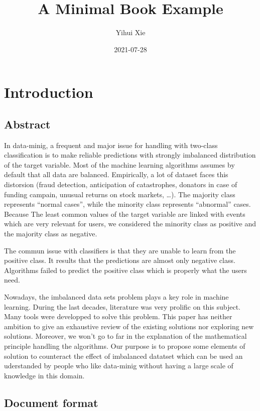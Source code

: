 \documentclass[
]{report}
\title{A Minimal Book Example}
\author{Yihui Xie}
\date{2021-07-28}
\begin{document}
\maketitle

{
\setcounter{tocdepth}{1}
\tableofcontents
}
\hypertarget{introduction}{%
\chapter{Introduction}\label{introduction}}

\hypertarget{abstract}{%
\section{Abstract}\label{abstract}}

In data-minig, a frequent and major issue for handling with two-class classification is to make reliable predictions with strongly imbalanced distribution of the target variable. Most of the machine learning algorithms assumes by default that all data are balanced. Empirically, a lot of dataset faces this distorsion (fraud detection, anticipation of catastrophes, donators in case of funding campain, unusual returns on stock markets, \ldots). The majority class represents ``normal cases'', while the minority class represents ``abnormal'' cases. Because The least common values of the target variable are linked with events which are very relevant for users, we considered the minority class as positive and the majority class as negative.

The commun issue with classifiers is that they are unable to learn from the positive class. It results that the predictions are almost only negative class. Algorithms failed to predict the positive class which is properly what the users need.

Nowadays, the imbalanced data sets problem plays a key role in machine learning. During the last decades, literature was very prolific on this subject. Many tools were developped to solve this problem. This paper has neither ambition to give an exhaustive review of the existing solutions nor exploring new solutions. Moreover, we won't go to far in the explanation of the mathematical principle handling the algorithms. Our purpose is to propose some elements of solution to counteract the effect of imbalanced datatset which can be used an uderstanded by people who like data-minig without having a large scale of knowledge in this domain.

\hypertarget{document-format}{%
\section{Document format}\label{document-format}}
\end{document}
